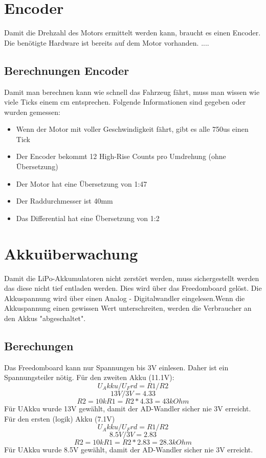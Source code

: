 \documentclass[a4paper, 10pt, fleqn]{article}
\begin{document}

\tableofcontents
\clearpage
\newpage
\section{Encoder}
Damit die Drehzahl des Motors ermittelt werden kann, braucht es einen Encoder. Die benötigte Hardware ist bereits auf dem Motor vorhanden. ....
\subsection{Berechnungen Encoder}
Damit man berechnen kann wie schnell das Fahrzeug fährt, muss man wissen wie viele Ticks einem cm entsprechen.
Folgende Informationen sind gegeben oder wurden gemessen:
\begin{itemize}
\item Wenn der Motor mit voller Geschwindigkeit fährt, gibt es alle 750us einen Tick
\item Der Encoder bekommt 12 High-Rise Counts pro Umdrehung (ohne Übersetzung)
\item Der Motor hat eine Übersetzung von 1:47
\item Der Raddurchmesser ist 40mm
\item Das Differential hat eine Übersetzung von 1:2
\end{itemize}

\section{Akkuüberwachung}
Damit die LiPo-Akkumulatoren nicht zerstört werden, muss sichergestellt werden das diese nicht tief entladen werden. Dies wird über das Freedomboard gelöst. Die Akkuspannung wird über einen Analog - Digitalwandler eingelesen.Wenn die Akkuspannung einen gewissen Wert unterschreiten, werden die Verbraucher an den Akkus "abgeschaltet".
\subsection{Berechungen}
Das Freedomboard kann nur Spannungen bis 3V einlesen. Daher ist ein Spannungsteiler nötig.
Für den zweiten Akku (11.1V):
\[	U_Akku/U_Frd=R1/R2\]
\[	13V/3V=4.33\]
\[	R2=10k R1=R2*4.33=43kOhm\]
Für UAkku wurde 13V gewählt, damit der AD-Wandler sicher nie 3V erreicht.\\
Für den ersten (logik) Akku (7.1V)
\[	U_Akku/U_Frd=R1/R2\]
\[	8.5V/3V=2.83\]
\[	R2=10k R1=R2*2.83=28.3kOhm\]
Für UAkku wurde 8.5V gewählt, damit der AD-Wandler sicher nie 3V erreicht.\\
\end{document}
